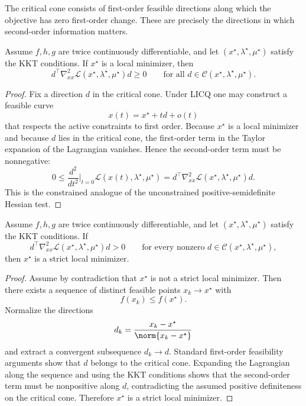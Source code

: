 \begin{remark}
	The critical cone consists of first-order feasible directions along which the objective has zero first-order change. These are precisely the directions in which second-order information matters.
\end{remark}

\begin{theorem}\label{thm:l3-second-order-necessary-condition}
	Assume $f,h,g$ are twice continuously differentiable, and let $(x^\star,\lambda^\star,\mu^\star)$ satisfy the KKT conditions. If $x^\star$ is a local minimizer, then
	\[
		d^\top \nabla^2_{xx}\mathcal{L}(x^\star,\lambda^\star,\mu^\star)d \ge 0
		\qquad \text{for all } d \in \mathcal{C}(x^\star,\lambda^\star,\mu^\star).
	\]
\end{theorem}
\begin{proof}
	Fix a direction $d$ in the critical cone. Under LICQ one may construct a feasible curve
	\[
		x(t)=x^\star+td+o(t)
	\]
	that respects the active constraints to first order. Because $x^\star$ is a local minimizer and because $d$ lies in the critical cone, the first-order term in the Taylor expansion of the Lagrangian vanishes. Hence the second-order term must be nonnegative:
	\[
		0 \le \frac{d^2}{dt^2}\Big|_{t=0} \mathcal{L}(x(t),\lambda^\star,\mu^\star)
		=
		d^\top \nabla^2_{xx}\mathcal{L}(x^\star,\lambda^\star,\mu^\star)d.
	\]
	This is the constrained analogue of the unconstrained positive-semidefinite Hessian test.
\end{proof}

\begin{theorem}\label{thm:l3-second-order-sufficient-condition}
	Assume $f,h,g$ are twice continuously differentiable, and let $(x^\star,\lambda^\star,\mu^\star)$ satisfy the KKT conditions. If
	\[
		d^\top \nabla^2_{xx}\mathcal{L}(x^\star,\lambda^\star,\mu^\star)d > 0
		\qquad \text{for every nonzero } d \in \mathcal{C}(x^\star,\lambda^\star,\mu^\star),
	\]
	then $x^\star$ is a strict local minimizer.
\end{theorem}
\begin{proof}
	Assume by contradiction that $x^\star$ is not a strict local minimizer. Then there exists a sequence of distinct feasible points $x_k \to x^\star$ with
	\[
		f(x_k)\le f(x^\star).
	\]
	Normalize the directions
	\[
		d_k=\frac{x_k-x^\star}{\norm{x_k-x^\star}}
	\]
	and extract a convergent subsequence $d_k \to d$. Standard first-order feasibility arguments show that $d$ belongs to the critical cone. Expanding the Lagrangian along the sequence and using the KKT conditions shows that the second-order term must be nonpositive along $d$, contradicting the assumed positive definiteness on the critical cone. Therefore $x^\star$ is a strict local minimizer.
\end{proof}

